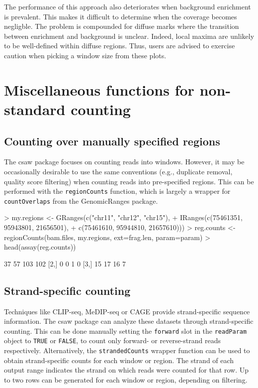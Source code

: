 \documentclass[12pt]{report}
\renewenvironment{Schunk}{\vspace{0pt}}{\vspace{0pt}}
\newcommand{\pkgname}{csaw}
\newcommand{\code}[1]{{\small\texttt{#1}}}
\newcommand{\granges}{GenomicRanges}
\begin{document}
The performance of this approach also deteriorates when background enrichment is prevalent.
This makes it difficult to determine when the coverage becomes negligble.
The problem is compounded for diffuse marks where the transition between enrichment and background is unclear.
Indeed, local maxima are unlikely to be well-defined within diffuse regions.
Thus, users are advised to exercise caution when picking a window size from these plots.

\section{Miscellaneous functions for non-standard counting}

\subsection{Counting over manually specified regions}
The \pkgname{} package focuses on counting reads into windows. 
However, it may be occasionally desirable to use the same conventions (e.g., duplicate removal, quality score filtering) when counting reads into pre-specified regions. 
This can be performed with the \code{regionCounts} function, which is largely a wrapper for \code{countOverlaps} from the \granges{} package.

\begin{Schunk}
\begin{Sinput}
> my.regions <- GRanges(c("chr11", "chr12", "chr15"),
+     IRanges(c(75461351, 95943801, 21656501), 
+     c(75461610, 95944810, 21657610)))
> reg.counts <- regionCounts(bam.files, my.regions, ext=frag.len, param=param)
> head(assay(reg.counts))
\end{Sinput}
\begin{Soutput}
     [,1] [,2] [,3] [,4]
[1,]   37   57  103  102
[2,]    0    0    1    0
[3,]   15   17   16    7
\end{Soutput}
\end{Schunk}

\subsection{Strand-specific counting}
Techniques like CLIP-seq, MeDIP-seq or CAGE provide strand-specific sequence information.
The \pkgname{} package can analyze these datasets through strand-specific counting.
This can be done manually setting the \code{forward} slot in the \code{readParam} object to \code{TRUE} or \code{FALSE}, to count only forward- or reverse-strand reads respectively.
Alternatively, the \code{strandedCounts} wrapper function can be used to obtain strand-specific counts for each window or region.
The strand of each output range indicates the strand on which reads were counted for that row.
Up to two rows can be generated for each window or region, depending on filtering.
\end{document}
